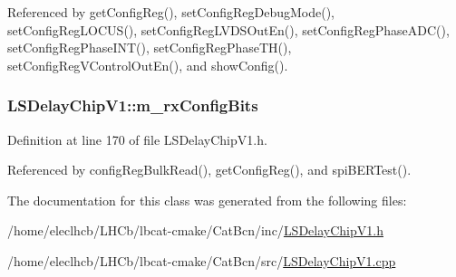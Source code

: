 Referenced by getConfigReg(), setConfigRegDebugMode(), setConfigRegLOCUS(), setConfigRegLVDSOutEn(), setConfigRegPhaseADC(), setConfigRegPhaseINT(), setConfigRegPhaseTH(), setConfigRegVControlOutEn(), and showConfig().\hypertarget{classLSDelayChipV1_ae049797212539b231b9722ae69a0491d}{
\subsubsection[{m\_\-rxConfigBits}]{ {\bf LSDelayChipV1::m\_\-rxConfigBits}}}
\label{classLSDelayChipV1_ae049797212539b231b9722ae69a0491d}


Definition at line 170 of file LSDelayChipV1.h.

Referenced by configRegBulkRead(), getConfigReg(), and spiBERTest().

The documentation for this class was generated from the following files:\begin{DoxyCompactItemize}
\item 
/home/eleclhcb/LHCb/lbcat-\/cmake/CatBcn/inc/\hyperlink{LSDelayChipV1_8h}{LSDelayChipV1.h}\item 
/home/eleclhcb/LHCb/lbcat-\/cmake/CatBcn/src/\hyperlink{LSDelayChipV1_8cpp}{LSDelayChipV1.cpp}\end{DoxyCompactItemize}
